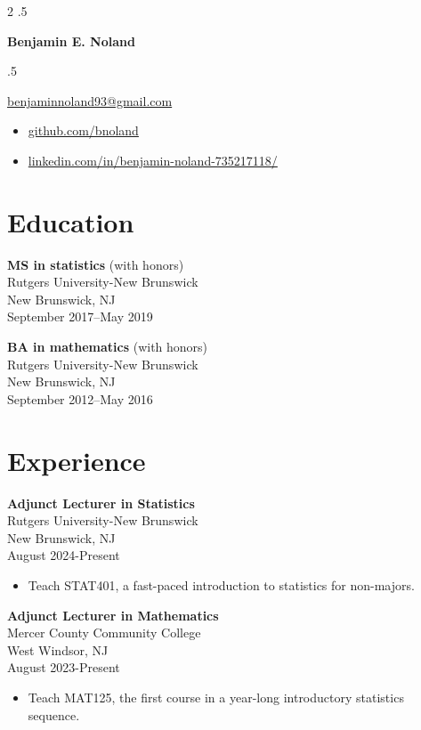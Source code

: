 \documentclass[letterpaper,11pt]{article}
\begin{document}
\begin{multicols}{2}
  \moveleft.5\hoffset\centerline{\Large\bf Benjamin E. Noland}
  \smallskip
  \moveleft.5\hoffset\centerline{\href{mailto:benjaminnoland93@gmail.com}{benjaminnoland93@gmail.com}}
  \columnbreak
  \begin{itemize}[label={}]
    \item \href{https://www.github.com/bnoland}{github.com/bnoland}
    \item \href{https://www.linkedin.com/in/benjamin-noland-735217118/}{linkedin.com/in/benjamin-noland-735217118/}
  \end{itemize}
\end{multicols}

\section*{Education}

\textbf{MS in statistics} (with honors) \\
Rutgers University-New Brunswick \\
New Brunswick, NJ \\
September 2017--May 2019

\medskip

\textbf{BA in mathematics} (with honors) \\
Rutgers University-New Brunswick \\
New Brunswick, NJ \\
September 2012--May 2016

\section*{Experience}

\textbf{Adjunct Lecturer in Statistics} \\
Rutgers University-New Brunswick \\
New Brunswick, NJ \\
August 2024-Present
\begin{itemize}
  \item Teach STAT401, a fast-paced introduction to statistics for non-majors.
\end{itemize}

\textbf{Adjunct Lecturer in Mathematics} \\
Mercer County Community College \\
West Windsor, NJ \\
August 2023-Present
\begin{itemize}
  \item Teach MAT125, the first course in a year-long introductory statistics sequence.
\end{itemize}
\end{document}
